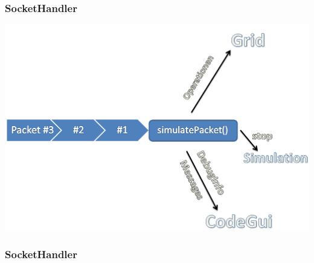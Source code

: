 \begin{frame}
\frametitle{SocketHandler}
	\includegraphics[scale=0.37]{client/socket-queue.PNG}
\end{frame}

\begin{frame}
\frametitle{SocketHandler}
\inputminted[linenos, numbersep=2pt, tabsize=4, frame=lines, label=Beispiel Paket]{json}{client/packet.json}
\end{frame}